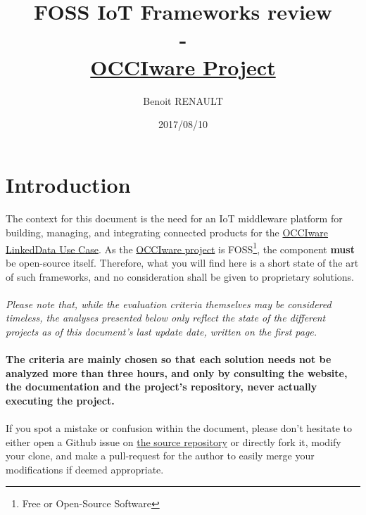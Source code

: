 \documentclass{article}
\title{%
  FOSS IoT Frameworks review \\
  - \\
  \large \href{http://www.occiware.org/bin/view/Main/}{OCCIware Project}}
\author{Benoit RENAULT}
\date{2017/08/10}
\begin{document}
\maketitle

\tableofcontents

\newpage

\section*{Introduction}
%

\paragraph{} The context for this document is the need for an IoT middleware platform for building, managing, and integrating connected products for the \href{https://github.com/occiware/occiware-ozwillo}{OCCIware LinkedData Use Case}. As the \href{http://www.occiware.org/bin/view/Main/}{OCCIware project} is FOSS\footnote{Free or Open-Source Software}, the component \textbf{must} be open-source itself. Therefore, what you will find here is a short state of the art of such frameworks, and no consideration shall be given to proprietary solutions.

\paragraph{} \emph{Please note that, while the evaluation criteria themselves may be considered timeless, the analyses presented below only reflect the state of the different projects as of this document's last update date, written on the first page.}

\paragraph{} \textbf{The criteria are mainly chosen so that each solution needs not be analyzed more than three hours, and only by consulting the website, the documentation and the project's repository, never actually executing the project.}

\paragraph{} If you spot a mistake or confusion within the document, please don't hesitate to either open a Github issue on \href{https://github.com/Xia0ben/FOSS_IoT_Frameworks}{the source repository} or directly fork it, modify your clone, and make a pull-request for the author to easily merge your modifications if deemed appropriate.
\end{document}
